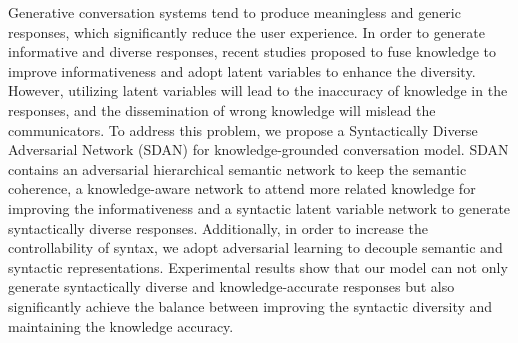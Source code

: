 Generative conversation systems tend to produce meaningless and generic responses, which significantly reduce the user experience. In order to generate informative and diverse responses, recent studies proposed to fuse knowledge to improve informativeness and adopt latent variables to enhance the diversity. However, utilizing latent variables will lead to the inaccuracy of knowledge in the responses, and the dissemination of wrong knowledge will mislead the communicators. To address this problem, we propose a Syntactically Diverse Adversarial Network (SDAN) for knowledge-grounded conversation model. SDAN contains an adversarial hierarchical semantic network to keep the semantic coherence, a knowledge-aware network to attend more related knowledge for improving the informativeness and a syntactic latent variable network to generate syntactically diverse responses. Additionally, in order to increase the controllability of syntax, we adopt adversarial learning to decouple semantic and syntactic representations. Experimental results show that our model can not only generate syntactically diverse and knowledge-accurate responses but also significantly achieve the balance between improving the syntactic diversity and maintaining the knowledge accuracy.
